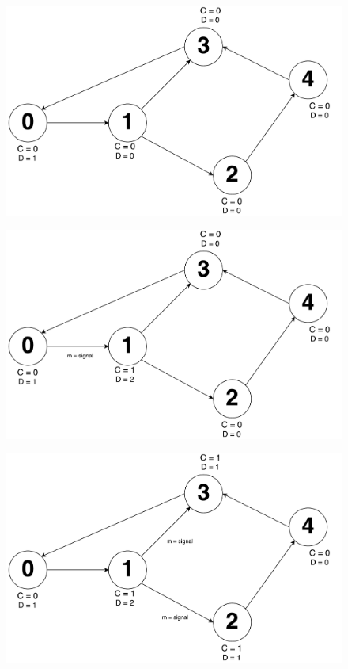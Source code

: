 \documentclass[times]{article}
\begin{document}
		\begin{figure}[H]
			\includegraphics[width=\linewidth]{q2/1.pdf}
		\end{figure}
		\begin{figure}[H]
			\includegraphics[width=\linewidth]{q2/2.pdf}
		\end{figure}
		\begin{figure}[H]
			\includegraphics[width=\linewidth]{q2/3.pdf}
		\end{figure}
\end{document}
